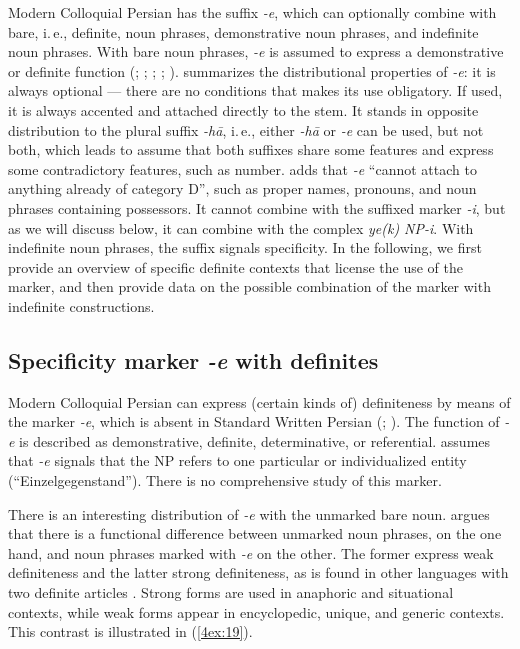\documentclass[output=paper]{langsci/langscibook}
\begin{document}
Modern Colloquial Persian has the suffix {\emph{-e}}, which can optionally combine with bare, i.\,e., definite, noun phrases, demonstrative noun phrases, and indefinite noun phrases. With bare noun phrases, {\emph{-e}} is assumed to express a demonstrative or definite function (\citealt[][40]{windfuhr:79}; \citealt[][163]{lazard:57}; \citealt[][67]{ghomeshi:03}; \citealt{toosarvandani:nasser:17}; \citealt{jasbi:20}). \cite[][173-177]{hincha:61} summarizes the distributional properties of {\emph{-e}}: it is always optional --- there are no conditions that makes its use obligatory. If used, it is always accented and attached directly to the stem. It stands in opposite distribution to the plural suffix {\emph{-hā}}, i.\,e., either {\emph{-hā}} or {\emph{-e}} can be used, but not both, which leads \cite[][175]{hincha:61} to assume that both suffixes share some features and express some contradictory features, such as number. \cite[][68]{ghomeshi:03} adds that {\emph{-e}} ``cannot attach to anything already of category D'', such as proper names, pronouns, and noun phrases containing possessors. It cannot combine with the suffixed marker {\emph{-i}}, but as we will discuss below, it can combine with the complex {\emph{ye(k) NP-i}}. With indefinite noun phrases, the suffix signals specificity. In the following, we first provide an overview of specific definite contexts that license the use of the marker, and then provide data on the possible combination of the marker with indefinite constructions. 


\subsection{Specificity marker {\emph{-e}} with definites}\label{4sec:41}

Modern Colloquial Persian can express (certain kinds of) definiteness by means of the marker {\emph{-e}}, which is absent in Standard Written Persian (\citealt[][50]{windfuhr:79}; \citealt{ghomeshi:03}). The function of {\emph{-e}} is described as demonstrative, definite, determinative, or referential. \cite[][176]{hincha:61} assumes that {\emph{-e}} signals that the NP refers to one particular or individualized entity (``Einzelgegenstand''). There is no comprehensive study of this marker.

There is an interesting distribution of {\emph{-e}} with the unmarked bare noun. \cite{nikravan:14} argues that there is a functional difference between unmarked noun phrases, on the one hand, and noun phrases marked with {\emph{-e}} on the other. The former express weak definiteness and the latter strong definiteness, as is found in other languages with two definite articles \citep[see][]{schwarz:13}. Strong forms are used in anaphoric and situational contexts, while weak forms appear in encyclopedic, unique, and generic contexts. This contrast is illustrated in (\ref{4ex:19}).
\end{document}
